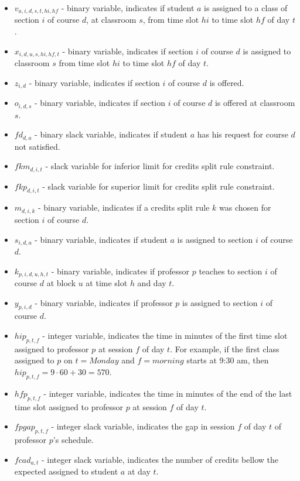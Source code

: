 \begin{itemize}
\item $v_{a,i,d,s,t,hi,hf}$ - binary variable, indicates if student $a$ is assigned to a class of section $i$ of course $d$, at classroom $s$, from time slot $hi$ to time slot $hf$ of day $t$. 
\item $x_{i,d,u,s,hi,hf,t}$ - binary variable, indicates if section $i$ of course $d$ is assigned to classroom $s$ from time slot $hi$ to time slot $hf$ of day $t$. 
\item $z_{i,d}$ - binary variable, indicates if section $i$ of course $d$ is offered. 
\item $o_{i,d,s}$ - binary variable, indicates if section $i$ of course $d$ is offered at classroom $s$. 
\item $fd_{d,a}$ - binary slack variable, indicates if student $a$ has his request for course $d$ not satisfied.
\item $fkm_{d,i,t}$ - slack variable for inferior limit for credits split rule constraint. 
\item $fkp_{d,i,t}$ - slack variable for superior limit for credits split rule constraint.
\item $m_{d,i,k}$ - binary variable, indicates if a credits split rule $k$ was chosen for section $i$ of course $d$.
\item $s_{i,d,a}$ - binary variable, indicates if student $a$ is assigned to section $i$ of course $d$.
\item $k_{p,i,d,u,h,t}$ - binary variable, indicates if professor $p$ teaches to section $i$ of course $d$ at block $u$ at time slot $h$ and day $t$.
\item $y_{p,i,d}$ - binary variable, indicates if professor $p$ is assigned to section $i$ of course $d$.
\item $hip_{p,t,f}$ - integer variable, indicates the time in minutes of the first time slot assigned to professor $p$ at session $f$ of day $t$. For example, if the first class assigned to $p$ on $t=Monday$ and $f=morning$ starts at 9:30 am, then $hip_{p,t,f}=9\cdot 60 + 30 = 570$.
\item $hfp_{p,t,f}$ - integer variable, indicates the time in minutes of the end of the last time slot assigned to professor $p$ at session $f$ of day $t$.
\item $fpgap_{p,t,f}$ - integer slack variable, indicates the gap in session $f$ of day $t$ of professor $p$'s schedule.
\item $fcad_{a,t}$ - integer slack variable, indicates the number of credits bellow the expected assigned to student $a$ at day $t$.

\end{itemize}
